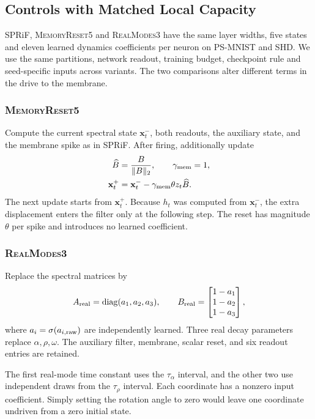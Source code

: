 \documentclass[letterpaper,journal]{IEEEtran}
\newcommand{\mr}{\textnormal{\textsc{MemoryReset5}}}
\newcommand{\rmodes}{\textnormal{\textsc{RealModes3}}}
\DeclareMathOperator{\diag}{diag}
\begin{document}
\subsection{Controls with Matched Local Capacity}
\label{sec:controls}

SPRiF, \mr{} and \rmodes{} have the same layer widths, five states and eleven learned dynamics coefficients per neuron on PS-MNIST and SHD. We use the same partitions, network readout, training budget, checkpoint rule and seed-specific inputs across variants. The two comparisons alter different terms in the drive to the membrane.

\subsubsection{\mr}
Compute the current spectral state $\mathbf x_t^-$, both readouts, the auxiliary state, and the membrane spike as in SPRiF. After firing, additionally update
\begin{equation}
\begin{aligned}
\widehat B&=\frac{B}{\|B\|_2},\qquad \gamma_{\rm mem}=1,\\
\mathbf x_t^+&=\mathbf x_t^--\gamma_{\rm mem}\theta z_t\widehat B.
\end{aligned}
\label{eq:memory_reset_control}
\end{equation}
The next update starts from $\mathbf x_t^+$. Because $h_t$ was computed from $\mathbf x_t^-$, the extra displacement enters the filter only at the following step. The reset has magnitude $\theta$ per spike and introduces no learned coefficient.

\subsubsection{\rmodes}
Replace the spectral matrices by
\begin{equation}
A_{\rm real}=\diag(a_1,a_2,a_3),\qquad
B_{\rm real}=\begin{bmatrix}1-a_1\\1-a_2\\1-a_3\end{bmatrix},
\label{eq:real_control}
\end{equation}
where $a_i=\sigma(a_{i,\rm raw})$ are independently learned. Three real decay parameters replace $\alpha,\rho,\omega$. The auxiliary filter, membrane, scalar reset, and six readout entries are retained.

The first real-mode time constant uses the $\tau_\alpha$ interval, and the other two use independent draws from the $\tau_\rho$ interval. Each coordinate has a nonzero input coefficient. Simply setting the rotation angle to zero would leave one coordinate undriven from a zero initial state.
\end{document}
